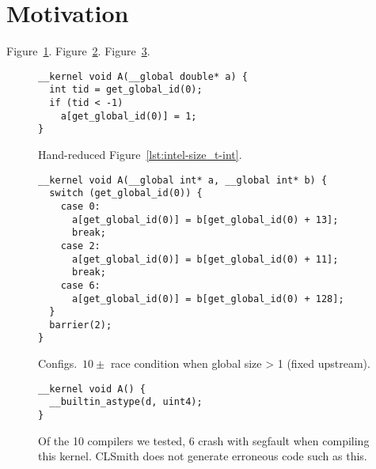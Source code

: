 \section{Motivation}

Figure~\ref{lst:intel-size_t-int-reduced}.
Figure~\ref{lst:oclgrind-llvm-densemap-assertion}.
Figure~\ref{fig:motivating-segfault}.

\begin{figure}
\begin{lstlisting}
__kernel void A(__global double* a) {
  int tid = get_global_id(0);
  if (tid < -1)
    a[get_global_id(0)] = 1;
}
\end{lstlisting}
\label{lst:intel-size_t-int-reduced}
\caption{Hand-reduced Figure~\ref{lst:intel-size_t-int}.}
\end{figure}

\begin{figure}
\lstset{language=[OpenCL]C}
\begin{lstlisting}
__kernel void A(__global int* a, __global int* b) {
  switch (get_global_id(0)) {
    case 0:
      a[get_global_id(0)] = b[get_global_id(0) + 13];
      break;
    case 2:
      a[get_global_id(0)] = b[get_global_id(0) + 11];
      break;
    case 6:
      a[get_global_id(0)] = b[get_global_id(0) + 128];
  }
  barrier(2);
}
\end{lstlisting}
\caption{%
  Configs.\ $10\pm$ race condition when global size > 1 (fixed upstream).
}
\label{lst:oclgrind-llvm-densemap-assertion}
\end{figure}

\begin{figure}
\lstset{language=[OpenCL]C}
\begin{lstlisting}
__kernel void A() {
  __builtin_astype(d, uint4);
}
\end{lstlisting}
\caption{%
  Of the 10 compilers we tested, 6 crash with segfault when compiling this kernel.
  CLSmith does not generate erroneous code such as this.
}%
\label{fig:motivating-segfault}
\end{figure}
